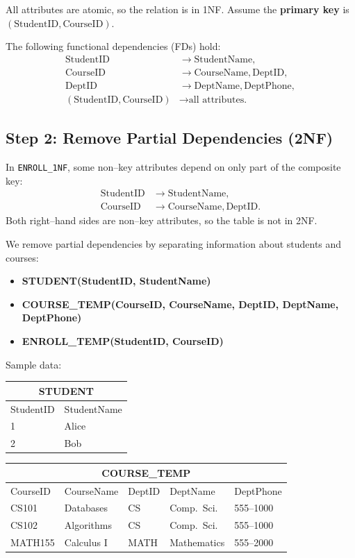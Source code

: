 \documentclass{article}
\begin{document}
All attributes are atomic, so the relation is in 1NF. Assume the \textbf{primary key} is $(\text{StudentID},\text{CourseID})$.

The following functional dependencies (FDs) hold:
\begin{align*}
\text{StudentID} &\to \text{StudentName}, \\
\text{CourseID} &\to \text{CourseName}, \text{DeptID}, \\
\text{DeptID} &\to \text{DeptName}, \text{DeptPhone}, \\
(\text{StudentID},\text{CourseID}) &\to \text{all attributes.}
\end{align*}

\bigskip

\subsection*{Step 2: Remove Partial Dependencies (2NF)}

In \texttt{ENROLL\_1NF}, some non--key attributes depend on only part of
the composite key:
\begin{align*}
\text{StudentID} &\to \text{StudentName}, \\
\text{CourseID} &\to \text{CourseName}, \text{DeptID}.
\end{align*}
Both right--hand sides are non--key attributes, so the table is not in 2NF.

We remove partial dependencies by separating information about students
and courses:

\begin{itemize}
  \item \textbf{STUDENT(StudentID, StudentName)}
  \item \textbf{COURSE\_TEMP(CourseID, CourseName, DeptID, DeptName, DeptPhone)}
  \item \textbf{ENROLL\_TEMP(StudentID, CourseID)}
\end{itemize}

Sample data:

\begin{center}
\begin{tabular}{ll}
\toprule
\multicolumn{2}{c}{\textbf{STUDENT}} \\
\midrule
StudentID & StudentName \\
\midrule
1 & Alice \\
2 & Bob \\
\bottomrule
\end{tabular}
\hspace{2em}
\begin{tabular}{lllll}
\toprule
\multicolumn{5}{c}{\textbf{COURSE\_TEMP}} \\
\midrule
CourseID & CourseName & DeptID & DeptName & DeptPhone \\
\midrule
CS101  & Databases   & CS   & Comp.~Sci.   & 555--1000 \\
CS102  & Algorithms  & CS   & Comp.~Sci.   & 555--1000 \\
MATH155 & Calculus I & MATH & Mathematics  & 555--2000 \\
\bottomrule
\end{tabular}
\end{center}
\end{document}
